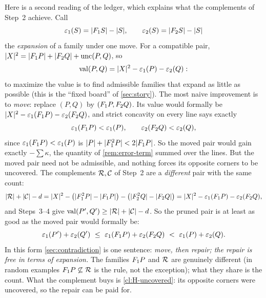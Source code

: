 \begin{remark}\label{rem:move-repair}
Here is a second reading of the ledger, which explains what the
complements of Step~2 achieve. Call
\[
 \varepsilon_1(S)=\lvert F_1 S\rvert-\lvert S\rvert,\qquad \varepsilon_2(S)=\lvert F_2 S\rvert-\lvert S\rvert
\]
the \emph{expansion} of a family under one move. For a compatible pair,
$\lvert X\rvert^2=\lvert F_1 P\rvert+\lvert F_2 Q\rvert+\operatorname{unc}(P,Q)$, so
\[
 \operatorname{val}(P,Q)=\lvert X\rvert^2-\varepsilon_1(P)-\varepsilon_2(Q):
\]
to maximize the value is to find admissible families that expand as little
as possible (this is the ``fixed board'' of \cref{sec:story}). The most
naive improvement is to \emph{move}: replace $(P,Q)$ by $(F_1 P,F_2 Q)$. Its
value would formally be $\lvert X\rvert^2-\varepsilon_1(F_1 P)-\varepsilon_2(F_2 Q)$, and
strict concavity on every line says exactly
\[
 \varepsilon_1(F_1 P)<\varepsilon_1(P),\qquad \varepsilon_2(F_2 Q)<\varepsilon_2(Q),
\]
since $\varepsilon_1(F_1 P)<\varepsilon_1(P)$ is $\lvert P\rvert+\lvert F_1^2P\rvert<2\lvert F_1 P\rvert$.
So the moved pair would gain exactly $-\sum\kappa$, the quantity of
\cref{rem:error-term} summed over the lines. But the moved pair need not be
admissible, and nothing forces its opposite corners to be uncovered. The
complements $\mathcal R,\mathcal C$ of Step~2 are a \emph{different} pair with the same
count:
\[
 \lvert \mathcal R\rvert+\lvert \mathcal C\rvert-d
 =\lvert X\rvert^2-\bigl(\lvert F_1^2P\rvert-\lvert F_1 P\rvert\bigr)-\bigl(\lvert F_2^2Q\rvert-\lvert F_2 Q\rvert\bigr)
 =\lvert X\rvert^2-\varepsilon_1(F_1 P)-\varepsilon_2(F_2 Q),
\]
and Steps~3--4 give $\operatorname{val}(P',Q')\ge\lvert \mathcal R\rvert+\lvert \mathcal C\rvert-d$. So the pruned pair is
at least as good as the moved pair would formally be:
\[
 \varepsilon_1(P')+\varepsilon_2(Q')\ \le\ \varepsilon_1(\Ff P)+\varepsilon_2(\Fs Q)
 \ <\ \varepsilon_1(P)+\varepsilon_2(Q).
\]
In this form \cref{sec:contradiction} is one sentence: \emph{move, then
repair; the repair is free in terms of expansion.} The families $F_1 P$ and
$\mathcal R$ are genuinely different (in random examples $F_1 P\not\subseteq\mathcal R$ is
the rule, not the exception); what they share is the count. What the
complement buys is \cref{cl:H-uncovered}: its opposite corners were
uncovered, so the repair can be paid for.
\end{remark}
